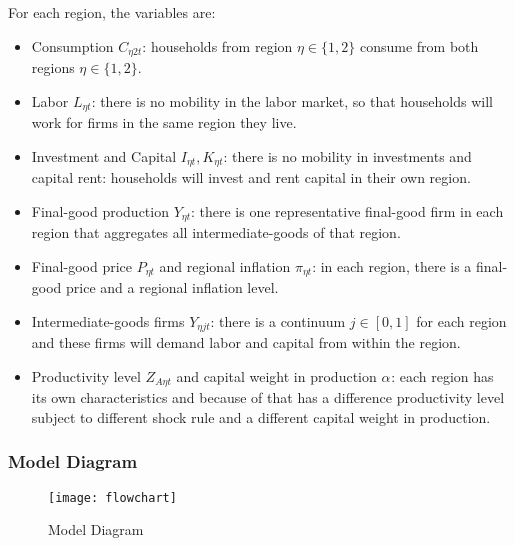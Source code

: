 \documentclass[../thesis.tex]{subfiles}
\begin{document}
	For each region, the variables are:

\begin{itemize}
	\item Consumption \(C_{\eta 2 t}\): households from region $\eta \in \{1,2\}$ consume from both regions $\eta \in \{1,2\}$.
	
	\item Labor \(L_{\eta t}\): there is no mobility in the labor market, so that households will work for firms in the same region they live.
	
	\item Investment and Capital \(I_{\eta t}, K_{\eta t}\): there is no mobility in investments and capital rent: households will invest and rent capital in their own region.
	
	\item Final-good production \(Y_{\eta t}\): there is one representative final-good firm in each region that aggregates all intermediate-goods of that region.
	
	\item Final-good price \(P_{\eta t}\) and regional inflation \(\pi_{\eta t}\): in each region, there is a final-good price and a regional inflation level.
	
	\item Intermediate-goods firms \(Y_{\eta jt}\): there is a continuum $j \in [0,1]$ for each region and these firms will demand labor and capital from within the region.
	
	\item Productivity level \(Z_{A\eta t}\) and capital weight in production $\alpha_{}$: each region has its own characteristics and because of that has a difference productivity level subject to different shock rule and a different capital weight in production.
	
\end{itemize}


\subsubsection*{Model Diagram}

\begin{figure}[h!]
	\centering
	\texttt{[image: flowchart]}
	\caption{Model Diagram}
	\label{fig:model-diagram}
\end{figure}
\end{document}
